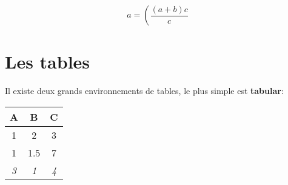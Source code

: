 \documentclass{article}
\begin{document}
$$
a = \left( \frac{(a+b)c}{c} \right.
$$

\section{Les tables}
Il existe deux grands environnements de tables, le plus simple est \textbf{tabular}:

\begin{tabular}{|c|c|c|}
\hline
\textbf{A} & \textbf{B} & \textbf{C} \\
\hline
\hline
1 & 2 & 3\\
\hline
1 & 1.5 & 7 \\
\hline
\textit{3} & \textit{1} & \textit{4} \\
\hline
\end{tabular}
\end{document}
